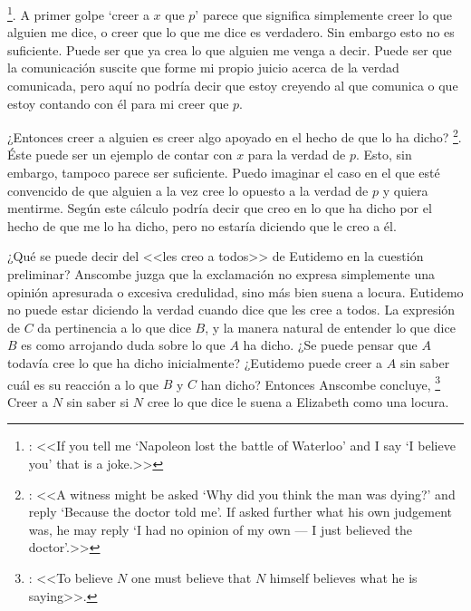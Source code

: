 \footnote{\cite[4]{anscombe2008faith:tobelieve}: <<If you tell me `Napoleon lost the battle of Waterloo' and I say `I believe you' that is a joke.>>}. A primer golpe `creer a $x$ que $p$' parece que significa simplemente creer lo que alguien me dice, o creer que lo que me dice es verdadero. Sin embargo esto no es suficiente. Puede ser que ya crea lo que alguien me venga a decir. Puede ser que la comunicación suscite que forme mi propio juicio acerca de la verdad comunicada, pero aquí no podría decir que estoy creyendo al que comunica o que estoy contando con él para mi creer que $p$.

¿Entonces creer a alguien es creer algo apoyado en el hecho de que lo ha dicho? \footnote{\cite[4]{anscombe2008faith:tobelieve}: <<A witness might be asked `Why did you think the man was dying?' and reply `Because the doctor told me'. If asked further what his own judgement was, he may reply `I had no opinion of my own --- I just believed the doctor'.>>}. Éste puede ser un ejemplo de contar con $x$ para la verdad de $p$. Esto, sin embargo, tampoco parece ser suficiente. Puedo imaginar el caso en el que esté convencido de que alguien a la vez cree lo opuesto a la verdad de $p$ y quiera mentirme. Según este cálculo podría decir que creo en lo que ha dicho por el hecho de que me lo ha dicho, pero no estaría diciendo que le creo a él.

¿Qué se puede decir del <<les creo a todos>> de Eutidemo en la cuestión preliminar? Anscombe juzga que la exclamación no expresa simplemente una opinión apresurada o excesiva credulidad, sino más bien suena a locura\autocite[5]{anscombe2008faith:tobelieve}. Eutidemo no puede estar diciendo la verdad cuando dice que les cree a todos. La expresión de $C$ da pertinencia a lo que dice $B$, y la manera natural de entender lo que dice $B$ es como arrojando duda sobre lo que $A$ ha dicho. ¿Se puede pensar que $A$ todavía cree lo que ha dicho inicialmente? ¿Eutidemo puede creer a $A$ sin saber cuál es su reacción a lo que $B$ y $C$ han dicho? Entonces Anscombe concluye, \footnote{\cite[5]{anscombe2008faith:tobelieve}: <<To believe $N$ one must believe that $N$ himself believes what he is saying>>.} Creer a $N$ sin saber si $N$ cree lo que dice le suena a Elizabeth como una locura.

